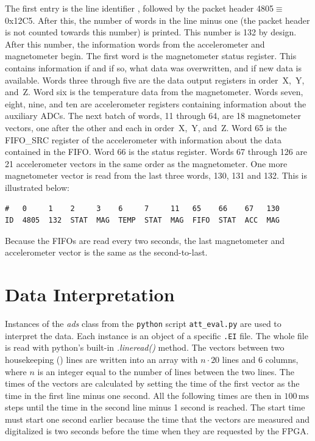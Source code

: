 The first entry is the line identifier , followed by the packet header 4805$\equiv$0x12C5. After this, the number of words in the line minus one (the packet header is not counted towards this number) is printed. This number is 132 by design. After this number, the information words from the accelerometer and magnetometer begin. The first word is the magnetometer status register. This contains information if and if so, what data was overwritten, and if new data is available. Words three through five are the data output registers in order~X,~Y, and~Z. Word six is the temperature data from the magnetometer. Words seven, eight, nine, and ten are accelerometer registers containing information about the auxiliary \acp{ADC}. The next batch of words, 11 through 64, are 18 magnetometer vectors, one after the other and each in order~X,~Y, and~Z. Word 65 is the FIFO\_SRC register of the accelerometer with information about the data contained in the \ac{FIFO}. Word 66 is the status register. Words 67 through 126 are 21 accelerometer vectors in the same order as the magnetometer. One more magnetometer vector is read from the last three words, 130, 131 and 132. This is illustrated below:
\begin{lstlisting}
#   0     1    2     3    6     7     11   65    66    67   130
ID  4805  132  STAT  MAG  TEMP  STAT  MAG  FIFO  STAT  ACC  MAG
\end{lstlisting}

Because the \acp{FIFO} are read every two seconds, the last magnetometer and accelerometer vector is the same as the second-to-last.

\section{Data Interpretation \label{sec:meth:data_interpretation}}
Instances of the \textit{ads} class from the \verb|python| script \verb|att_eval.py| are used to interpret the data. Each instance is an object of a specific \verb|.EI| file. The whole file is read with python's built-in \textit{.lineread()} method. The vectors between two housekeeping () lines are written into an array with $n\cdot20$ lines and 6 columns, where $n$ is an integer equal to the number of  lines between the two  lines. The times of the vectors are calculated by setting the time of the first vector as the time in the first  line minus one second. All the following times are then in $100\,\mathrm{ms}$ steps until the time in the second  line minus 1 second is reached. The start time must start one second earlier because the time that the vectors are measured and digitalized is two seconds before the time when they are requested by the \ac{FPGA}.


